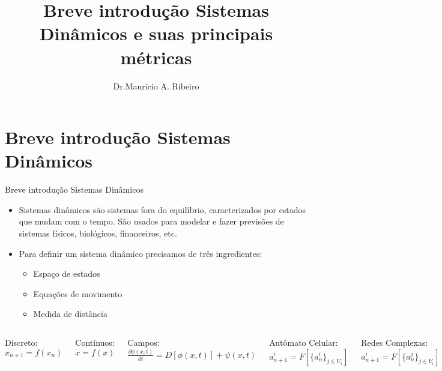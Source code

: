 \documentclass[12pt,aspectratio=169]{beamer}
\author[Dr. M.A.Ribeiro ]{Dr.Mauricio A. Ribeiro}
\title[Ribeiro, M. A.]{Breve introdução Sistemas Dinâmicos e suas principais métricas}
\institute[UTFPR-PG]{Universidade Tecnológica Federal do Paraná - Campus Ponta Grossa}
\begin{document}
\begin{frame}
\titlepage
\end{frame}

\begin{frame}
\tableofcontents
\end{frame}


\section{Breve introdução Sistemas Dinâmicos}
\begin{frame}{Breve introdução Sistemas Dinâmicos}
\begin{itemize}
    \item Sistemas dinâmicos são sistemas fora do equilíbrio, caracterizados por estados que mudam com o tempo. São usados para modelar e fazer previsões de sistemas físicos, biológicos, financeiros, etc.
    
    \item Para definir um sistema dinâmico precisamos de três ingredientes:
    \begin{itemize}
        \item Espaço de estados
        \item Equações de movimento
        \item Medida de distância 
    \end{itemize}
\end{itemize}
\end{frame}


\begin{frame}
\begin{columns}
\begin{block}{Discreto:}
$x_{n+1}=f(x_n)$
\end{block}
\begin{block}{ Contínuos:}
$\dot{x}=f(x)$
\end{block}
\begin{block}{ Campos:}
$\frac{\partial\phi(x,t)}{\partial t}=D[\phi(x,t)]+\psi(x,t)$
\end{block}
\begin{block}{  Autômato Celular:}
$a^{i}_{n+1}= F[\{a^i_n\}_{j\in U_i}]$
\end{block}
\begin{block}{ Redes Complexas: }
$a^{i}_{n+1} = F[\{a^{j}_{n}\}_{j \in V_i}]$
\end{block}
\end{columns}
\end{frame}
\end{document}
